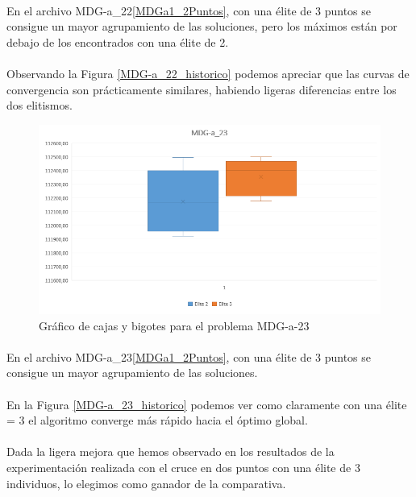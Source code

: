 	\paragraph{}En el archivo MDG-a\_22\ref{MDGa1_2Puntos}, con una élite de 3 puntos se consigue un mayor agrupamiento de las soluciones, pero los máximos están por debajo de los encontrados con una élite de 2.
	
	\paragraph{}Observando la Figura \ref{MDG-a_22_historico} podemos apreciar que las curvas de convergencia son prácticamente similares, habiendo ligeras diferencias entre los dos elitismos. 
	
	\begin{figure}[H]
		\centering
		\includegraphics[scale=0.65]{img/2point_2vs3/MDG3}
		\caption{Gráfico de cajas y bigotes para el problema MDG-a-23}
		\label{MDGa3_2Puntos}
		
	\end{figure}

	\paragraph{}En el archivo MDG-a\_23\ref{MDGa1_2Puntos}, con una élite de 3 puntos se consigue un mayor agrupamiento de las soluciones.
	
	\paragraph{}En la Figura \ref{MDG-a_23_historico} podemos ver como claramente con una élite = 3 el algoritmo converge más rápido hacia el óptimo global.
		
	\paragraph{}Dada la ligera mejora que hemos observado en los resultados de la experimentación realizada con el cruce en dos puntos con una élite de 3 individuos, lo elegimos como ganador de la comparativa.
	

